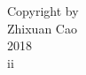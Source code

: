 


\begin{center}
\null
\vfill
\begin{doublespace}
Copyright by \\ 
Zhixuan Cao \\ 
2018 \\
ii
\end{doublespace}
\end{center}
